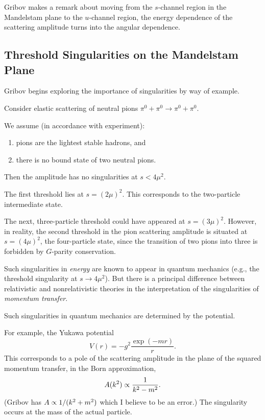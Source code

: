 \M[-1]
Gribov makes a remark about moving from the $s$-channel region in the
Mandelstam plane to the $u$-channel region, the energy dependence of the
scattering amplitude turns into the angular dependence.

\subsection{Threshold Singularities on the Mandelstam Plane}

\M
Gribov begins exploring the importance of singularities by way of
example.

\M[1]
Consider elastic scattering of neutral pions
$\pi^{0}+\pi^{0}\to\pi^{0}+\pi^{0}$.

 We assume (in accordance with experiment):
\begin{enumerate}
\item pions are the lightest stable hadrons, and
\item there is no bound state of two neutral pions.
\end{enumerate}

\M Then the amplitude has no singularities at $s<4\mu^{2}$.

\M
The first threshold lies at $s=(2\mu)^{2}$. This corresponds to the
two-particle intermediate state.

\M The next, three-particle threshold could have appeared at
$s=(3\mu)^{2}$.
However, in reality, the second threshold in the pion scattering
amplitude is situated at $s=(4\mu)^{2}$, the four-particle state, since
the transition of two pions into three is forbidden by $G$-parity
conservation.

Such singularities in \emph{energy} are known to appear in quantum
mechanics (e.g., the threshold singularity at $s\to 4\mu^{2}$).
But there is a principal difference between relativistic and
nonrelativistic theories in the interpretation of the singularities of
\emph{momentum transfer}.

 Such singularities in quantum mechanics are
determined by the potential.

 For example, the Yukawa potential
\begin{equation}
V(r)=-g^{2}\frac{\exp(- mr)}{r}.
\end{equation}
This corresponds to a pole of the scattering amplitude in the plane of
the squared momentum transfer, in the Born approximation,
\begin{equation}
A(k^{2})\propto\frac{1}{k^{2}-m^{2}}.
\end{equation}
(Gribov has $A\propto 1/(k^{2}+m^{2})$ which I believe to be an error.)
The singularity occurs at the mass of the actual particle.

